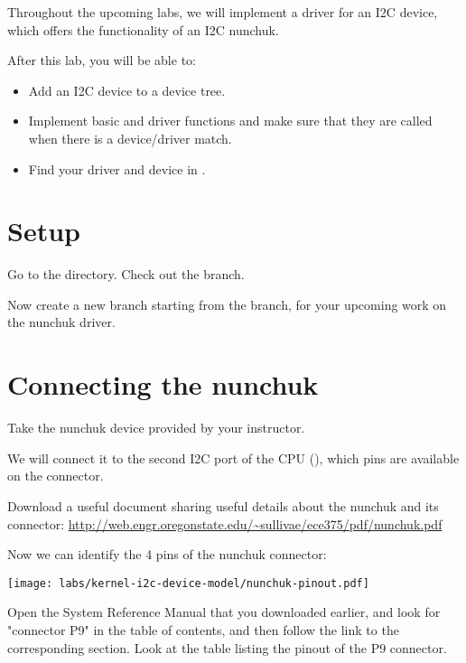 
Throughout the upcoming labs, we will implement a driver for an I2C
device, which offers the functionality of an I2C nunchuk.

After this lab, you will be able to:

\begin{itemize}
\item Add an I2C device to a device tree.
\item Implement basic  and  driver
functions and make sure that they are called when there is a
device/driver match.
\item Find your driver and device in .
\end{itemize}

\section{Setup}

Go to the  directory. Check out the
 branch.

Now create a new  branch starting from the
 branch,  for your upcoming work on the nunchuk
driver.

\section{Connecting the nunchuk}

Take the nunchuk device provided by your instructor.

We will connect it to the second I2C port of the CPU (),
which pins are available on the  connector.

Download a useful document sharing useful details about the nunchuk
and its connector:
\url{http://web.engr.oregonstate.edu/~sullivae/ece375/pdf/nunchuk.pdf}

Now we can identify the 4 pins of the nunchuk connector:

\begin{center}
\texttt{[image: labs/kernel-i2c-device-model/nunchuk-pinout.pdf]}
\end{center}

Open the System Reference Manual that you downloaded earlier,
and look for "connector P9" in the table of contents, and then
follow the link to the corresponding section. Look at the table listing
the pinout of the P9 connector.

